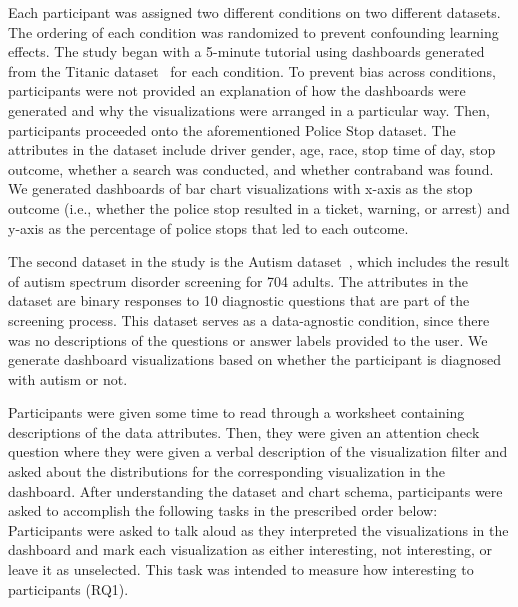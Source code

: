 \par Each participant was assigned two different conditions on two different datasets. The ordering of each condition was randomized to prevent confounding learning effects. The study began with a 5-minute tutorial using dashboards generated from the Titanic dataset~\cite{titanic} for each condition. To prevent bias across conditions, participants were not provided an explanation of how the dashboards were generated and why the visualizations were arranged in a particular way. Then, participants proceeded onto the aforementioned Police Stop dataset. The attributes in the dataset include driver gender, age, race, stop time of day, stop outcome, whether a search was conducted, and whether contraband was found. We generated dashboards of bar chart visualizations with x-axis as the stop outcome (i.e., whether the police stop resulted in a ticket, warning, or arrest) and y-axis as the percentage of police stops that led to each outcome. %
\par The second dataset in the study is the Autism dataset~\cite{autism}, which includes the result of autism spectrum disorder screening for 704 adults. The attributes in the dataset are binary responses to 10 diagnostic questions that are part of the screening process. This dataset serves as a data-agnostic condition, since there was no descriptions of the questions or answer labels provided to the user. We generate dashboard visualizations based on whether the participant is diagnosed with autism or not.
\par Participants were given some time to read through a worksheet containing descriptions of the data attributes. Then, they were given an attention check question where they were given a verbal description of the visualization filter and asked about the distributions for the corresponding visualization in the dashboard. After understanding the dataset and chart schema, participants were asked to accomplish the following tasks in the prescribed order below:
 Participants were asked to talk aloud as they interpreted the visualizations in the dashboard and mark each visualization as either interesting, not interesting, or leave it as unselected. This task was intended to measure how interesting  to participants (RQ1).%

